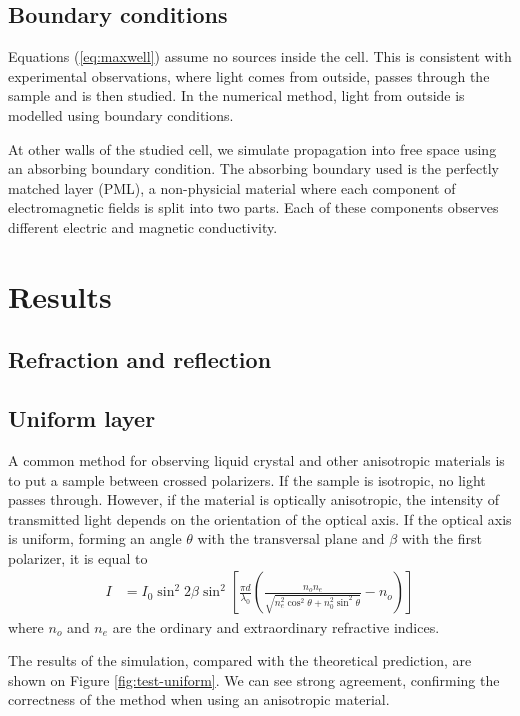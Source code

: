 \documentclass[a4paper,10pt]{article}
\begin{document}
\begin{multicols}{2}
\subsection{Boundary conditions}

Equations (\ref{eq:maxwell}) assume no sources inside the cell. 
This is consistent with experimental observations, where light comes from outside, passes through the sample and is then studied. 
In the numerical method, light from outside is modelled using boundary conditions. 

At other walls of the studied cell, we simulate propagation into free space using an absorbing boundary condition. 
The absorbing boundary used is the perfectly matched layer (\textsc{PML}), a non-physicial material where each component of electromagnetic fields is split into two parts. 
Each of these components observes different electric and magnetic conductivity. 

\section{Results}

\subsection{Refraction and reflection}

\subsection{Uniform layer}

A common method for observing liquid crystal and other anisotropic materials is to put a sample between crossed polarizers. 
If the sample is isotropic, no light passes through. 
However, if the material is optically anisotropic, the intensity of transmitted light depends on the orientation of the optical axis. 
If the optical axis is uniform, forming an angle $\theta$ with the transversal plane and $\beta$ with the first polarizer, it is equal to\cite{kleman}
\begin{align}
 I &= I_0 \sin^2 2\beta \sin^2 \left[ \frac{\pi d}{\lambda_0} \left( \frac{n_o n_e}{\sqrt{n_e^2 \cos^2 \theta + n_0^2 \sin^2 \theta}} - n_o \right)\right] \nonumber
\end{align}
where $n_o$ and $n_e$ are the ordinary and extraordinary refractive indices. 

The results of the simulation, compared with the theoretical prediction, are shown on Figure \ref{fig:test-uniform}. 
We can see strong agreement, confirming the correctness of the method when using an anisotropic material. 


\end{multicols}
\end{document}
